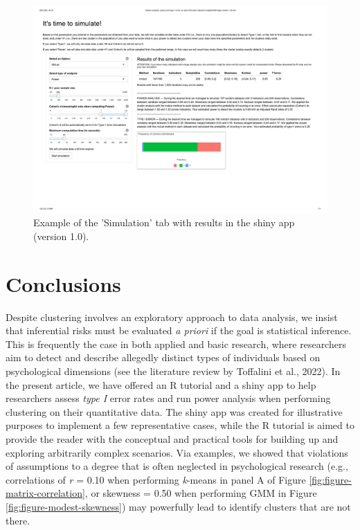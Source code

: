 \documentclass[
  man,floatsintext]{apa7}
\begin{document}
\begin{figure}

{\centering \includegraphics[width=1\linewidth]{figures_external/Figure_Simulation_shiny} 

}

\caption{Example of the 'Simulation' tab with results in the shiny app (version 1.0).}\label{fig:figure-simulation-shiny}
\end{figure}

\hypertarget{conclusions}{%
\section{Conclusions}\label{conclusions}}

Despite clustering involves an exploratory approach to data analysis, we insist that inferential risks must be evaluated \emph{a priori} if the goal is statistical inference. This is frequently the case in both applied and basic research, where researchers aim to detect and describe allegedly distinct types of individuals based on psychological dimensions (see the literature review by Toffalini et al., 2022). In the present article, we have offered an R tutorial and a shiny app to help researchers assess \emph{type I} error rates and run power analysis when performing clustering on their quantitative data. The shiny app was created for illustrative purposes to implement a few representative cases, while the R tutorial is aimed to provide the reader with the conceptual and practical tools for building up and exploring arbitrarily complex scenarios. Via examples, we showed that violations of assumptions to a degree that is often neglected in psychological research (e.g., correlations of \emph{r} = 0.10 when performing \emph{k}-means in panel A of Figure \ref{fig:figure-matrix-correlation}, or skewness = 0.50 when performing GMM in Figure \ref{fig:figure-modest-skewness}) may powerfully lead to identify clusters that are not there.
\end{document}

